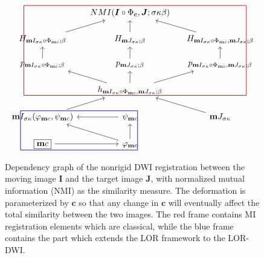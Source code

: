 \documentclass[twocolumn]{svjour3}
\begin{document}
\begin{figure}[ht]
\begin{equation*}
\begin{tikzcd}[column sep=0.4cm,row sep=0.5cm]
  ~& NMI( \bsI\circ\Phi_{\bsc},\bsJ;\sigma\kappa\beta)&~\\
  H_{\bm I_{\sigma\kappa}\circ\Phi_{\bm c};\beta} \ar[ur]&  
  H_{\bm J_{\sigma\kappa};\beta}\ar[u] & 
  H_{\bm I_{\sigma\kappa}\circ\Phi_{\bm c}, \bm J_{\sigma\kappa};\beta}\ar[lu]\\
  p_{\bm I_{\sigma\kappa}\circ\Phi_{\bm c};\beta}\ar[u]  & 
  p_{\bm J_{\sigma\kappa};\beta}\ar[u]  & 
  p_{\bm I_{\sigma\kappa}\circ\Phi_{\bm c}, \bm J_{\sigma\kappa};\beta}\ar[u]\\
  ~ & h_{\bm I_{\sigma\kappa}\circ\Phi_{\bm c},\bm J_{\sigma\kappa};\beta}\ar[ul]\ar[u]\ar[ur]& ~\\
  \bm I_{\sigma\kappa}(\phi_{\bm c},\psi_{\bm c})\ar[ur]&\psi_{\bm c}\ar[l]&\bm J_{\sigma\kappa}\ar[ul]\\
  \boxed{\bm c}\ar[r ]& \phi_{\bm c}\ar[lu] \ar[u]&
  \ar[from=1-1,to=1-3,color=red,dash,line width=0.65pt,start
  anchor={[xshift=-2.2em,yshift=2ex]center},end
  anchor={[xshift=+3.1em,yshift=2ex]center}]
  \ar[from=1-1,to=4-1,color=red,dash,line width=0.65pt,start
  anchor={[xshift=-2.2em,yshift=2ex]center},end
  anchor={[xshift=-2.2em,yshift=-1.5ex]center}]
  \ar[from=4-1,to=4-3,color=red,dash,line width=0.65pt,start
  anchor={[xshift=-2.2em,yshift=-1.5ex]center},end
  anchor={[xshift=+3.1em,yshift=-1.5ex]center}]
  \ar[from=1-3,to=4-3,color=red,dash,line width=0.65pt,start
  anchor={[xshift=+3.1em,yshift=2ex]center},end
  anchor={[xshift=+3.1em,yshift=-1.5ex]center}]
  \ar[from=5-1,to=5-2,color=blue,dash,line width=0.65pt,start
  anchor={[xshift=-2.6em,yshift=1.7ex]center},end
  anchor={[xshift=+0.9em,yshift=1.7ex]center}]
  \ar[from=6-1,to=6-2,color=blue,dash,line width=0.65pt,start
  anchor={[xshift=-2.6em,yshift=-1.7ex]center},end
  anchor={[xshift=+0.9em,yshift=-1.7ex]center}]
  \ar[from=5-1,to=6-1,color=blue,dash,line width=0.65pt,start
  anchor={[xshift=-2.6em,yshift=1.7ex]center},end
  anchor={[xshift=-2.6em,yshift=-1.7ex]center}]
  \ar[from=5-2,to=6-2,color=blue,dash,line width=0.65pt,start
  anchor={[xshift=+0.9em,yshift=1.7ex]center},end
  anchor={[xshift=+0.9em,yshift=-1.7ex]center}]
\end{tikzcd}
\end{equation*}
\caption{Dependency graph of the nonrigid DWI registration between the moving image
  $\bm I$ and the target image $\bm J$, with normalized mutual information (NMI) as the
  similarity measure. The deformation is parameterized by $\bm c$ so that any change in
  $\bm c$ will eventually affect the total similarity between the two images. The red
  frame contains MI registration elements which are classical, while the blue frame
  contains the part which extends the LOR framework to the LOR-DWI.}
    \label{fig:dependcygraph}
\end{figure}
\end{document}
